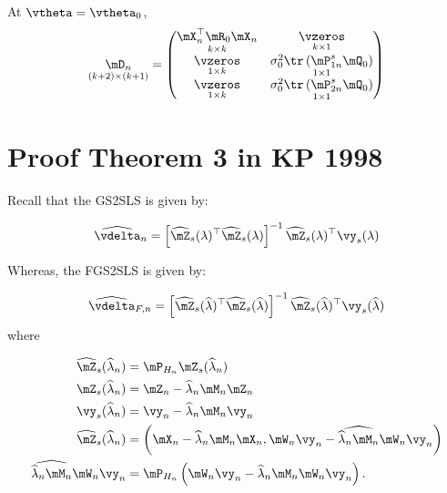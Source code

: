 \documentclass[english,12pt]{book}\usepackage[]{graphicx}\usepackage[]{xcolor}
\begin{document}
\begin{subappendices}
At $\vtheta = \vtheta_0$,
\begin{equation*}
\underset{(k + 2)\times (k + 1)}{\mD_n} = 
\begin{pmatrix}
  \underset{k\times k}{\mX_n^\top\mR_0\mX_n} & \underset{k\times 1}{\vzeros} \\
  \underset{1 \times k}{\vzeros} & \underset{1\times 1}{\sigma_0^2 \tr\left(\mP_{1n}^{s}\mQ_0\right)}\\
  \underset{1\times k}{\vzeros} & \underset{1\times 1}{\sigma_0^2 \tr\left(\mP_{2n}^{s}\mQ_0\right)}
\end{pmatrix}
\end{equation*}


\section{Proof Theorem 3 in KP 1998}

Recall that the GS2SLS is given by:

\begin{equation}
  \widehat{\vdelta}_n = \left[\widehat{\mZ}_s(\lambda)^\top\widehat{\mZ}_s(\lambda)\right]^{-1}\widehat{\mZ}_s(\lambda)^\top\vy_s(\lambda)
\end{equation}

Whereas, the FGS2SLS is given by:

\begin{equation}
  \widehat{\vdelta}_{F, n} = \left[\widehat{\mZ}_s(\widehat{\lambda})^\top\widehat{\mZ}_s(\widehat{\lambda})\right]^{-1}\widehat{\mZ}_s(\widehat{\lambda})^\top\vy_s(\widehat{\lambda})
\end{equation}
%
where

\begin{equation}
  \begin{aligned}
    \widehat{\mZ}_s(\widehat{\lambda}_n) & = \mP_{H_n}\mZ_s(\widehat{\lambda}_n) \\
    \mZ_s(\widehat{\lambda}_n) & = \mZ_n - \widehat{\lambda}_n\mM_n\mZ_n \\
    \vy_s(\widehat{\lambda}_n) & = \vy_n - \widehat{\lambda}_n\mM_n\vy_n \\
    \widehat{\mZ}_s(\widehat{\lambda}_n) & = \left(\mX_n - \widehat{\lambda}_n\mM_n\mX_n, \mW_n\vy_n - \widehat{\widehat{\lambda}_n\mM_n}\mW_n\vy_n\right) \\
    \widehat{\widehat{\lambda}_n\mM_n}\mW_n\vy_n & = \mP_{H_n}\left(\mW_n\vy_n - \widehat{\lambda}_n\mM_n\mW_n\vy_n\right).
 \end{aligned}
\end{equation}


\end{subappendices}
\end{document}
